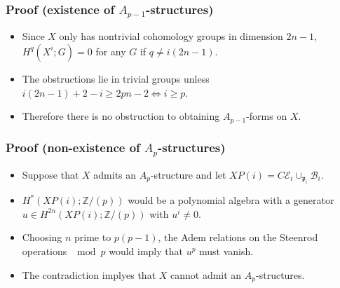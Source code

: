 \documentclass{beamer}
\theoremstyle{definition}
\newcommand{\Z}{\mathbb{Z}}
\begin{document}
\begin{frame}
\frametitle{Proof (existence of $A_{p-1}$-structures)}
\begin{itemize}
\item<1-> Since $X$ only has nontrivial cohomology groups in dimension $2n-1$, $H^q(X^i;G)=0$ for any $G$ if $q\neq i(2n-1)$.
\item<2-> The obstructions lie in trivial groups unless $i(2n-1)+2-i\geq 2pn-2\Leftrightarrow i\geq p$.
\item<3-> Therefore there is no obstruction to obtaining $A_{p-1}$-forms on $X$.
\end{itemize}
\end{frame}
\begin{frame}
\frametitle{Proof (non-existence of $A_{p}$-structures)}
\begin{itemize}
\item<1-> Suppose that $X$ admits an $A_p$-structure and let $XP(i)=C\mathcal{E}_i\cup_{\mathfrak{p}_i}\mathcal{B}_i$.
\item<2-> $H^*(XP(i);\Z/(p))$ would be a polynomial algebra with a generator $u\in H^{2n}(XP(i);\Z/(p))$ with $u^i\neq 0$.
\item<3-> Choosing $n$ prime to $p(p-1)$, the Adem relations on the Steenrod operations $\mod p$ would imply that $u^p$ must vanish. %
\item<4-> The contradiction implyes that $X$ cannot admit an $A_{p}$-structures.
\end{itemize}
\end{frame}
\end{document}
